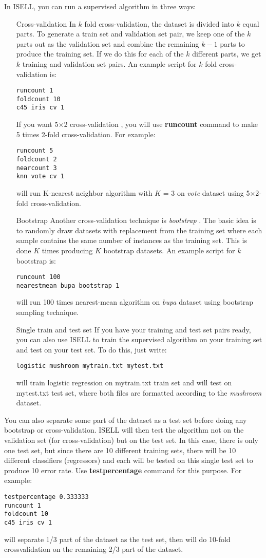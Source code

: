 \documentclass[a4paper,12pt]{book}
\begin{document}
In ISELL, you can run a supervised algorithm in three ways:
\begin{enumerate}
\item[Cross-validation] In $k$ fold cross-validation, the dataset is divided into $k$ equal parts. To generate a train set and validation set pair, we keep one of the $k$ parts out as the validation set and combine the remaining $k - 1$ parts to produce the training set. If we do this for each of the $k$ different parts, we get $k$ training and validation set pairs. An example script for $k$ fold cross-validation is:
\begin{verbatim}
runcount 1
foldcount 10
c45 iris cv 1
\end{verbatim}
If you want 5$\times$2 cross-validation \cite{dietterich98}, you will use {\bf runcount} command to make 5 times 2-fold cross-validation. For example:
\begin{verbatim}
runcount 5
foldcount 2
nearcount 3
knn vote cv 1
\end{verbatim}
will run K-nearest neighbor algorithm with $K$ = 3 on {\em vote} dataset  using 5$\times$2-fold cross-validation.
\item[Bootstrap] Another cross-validation technique is {\em bootstrap} \cite{efron79}. The basic idea is to randomly draw datasets with replacement from the training set where each sample contains the same number of instances as the training set. This is done $K$ times producing $K$ bootstrap datasets. An example script for $k$ bootstrap is:
\begin{verbatim}
runcount 100
nearestmean bupa bootstrap 1
\end{verbatim}
will run 100 times nearest-mean algorithm on {\em bupa} dataset using bootstrap sampling technique.
\item[Single train and test set] If you have your training and test set pairs ready, you can also use ISELL to train the supervised algorithm on your training set and test on your test set. To do this, just write:
\begin{verbatim}
logistic mushroom mytrain.txt mytest.txt
\end{verbatim}
will train logistic regression on mytrain.txt train set and will test on mytest.txt test set, where both files are formatted according to the {\em mushroom} dataset.
\end{enumerate}

You can also separate some part of the dataset as a test set before doing any bootstrap or cross-validation. ISELL will then test the algorithm not on the validation set (for cross-validation) but on the test set. In this case, there is only one test set, but since there are 10 different training sets, there will be 10 different classifiers (regressors) and each will be tested on this single test set to produce 10 error rate. Use {\bf testpercentage} command for this purpose. For example:
\begin{verbatim}
testpercentage 0.333333
runcount 1
foldcount 10
c45 iris cv 1
\end{verbatim}
will separate 1/3 part of the dataset as the test set, then will do 10-fold crossvalidation on the remaining 2/3 part of the dataset.
\end{document}
